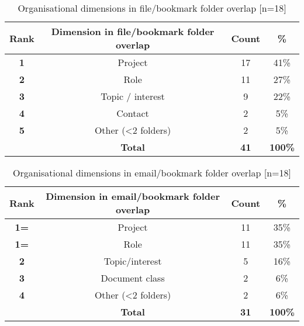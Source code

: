 \begin{table}[hbt]
\begin{center}
\begin{footnotesize}
\setlength{\extrarowheight}{2pt}
\begin{tabular}{|c|c|c|c|}
\hline
{\bf Rank} & {\bf Dimension in file/bookmark folder overlap} & {\bf Count} &   {\bf \%} \\
\hline
   {\bf 1} &    Project &         17 &       41\% \\
\hline
   {\bf 2} &       Role &         11 &       27\% \\
\hline
   {\bf 3} & Topic / interest &          9 &       22\% \\
\hline
   {\bf 4} &    Contact &          2 &        5\% \\
\hline
   {\bf 5} & Other (<2 folders) &          2 &        5\% \\
\hline
    {\bf } &     {\bf Total} &   {\bf 41} & {\bf 100\%} \\
\hline
\end{tabular}  
\end{footnotesize}
\caption{Organisational dimensions in file/bookmark folder overlap [n=18]}
\label{table:file-bookmark-overlap}
\end{center}
\end{table}

\begin{table}[hbt]
\begin{center}
\begin{footnotesize}
\begin{tabular}{|c|c|c|c|}
\hline
{\bf Rank} & {\bf Dimension in email/bookmark folder overlap} & {\bf Count} &   {\bf \%} \\
\hline
  {\bf 1=} &    Project &         11 &       35\% \\
\hline
  {\bf 1=} &       Role &         11 &       35\% \\
\hline
   {\bf 2} & Topic/interest &          5 &       16\% \\
\hline
   {\bf 3} & Document class &          2 &        6\% \\
\hline
   {\bf 4} & Other (<2 folders) &          2 &        6\% \\
\hline
    {\bf } & {\bf Total} &   {\bf 31} & {\bf 100\%} \\
\hline
\end{tabular}  

\end{footnotesize}
\caption{Organisational dimensions in email/bookmark folder overlap [n=18]}
\label{table:email-bookmark-overlap}
\end{center}
\end{table}


